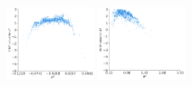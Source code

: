 \documentclass[mathserif, 10pt]{beamer}
\begin{document}
\begin{frame}
\begin{center}
        \includegraphics[width=0.19\textwidth]{figures/SHAP_aq.pdf}
        \includegraphics[width=0.19\textwidth]{figures/SHAP_bq.pdf}
    \end{center}
    

\end{frame}
\end{document}
